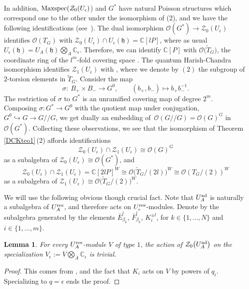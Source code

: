 \documentclass[10pt,a4paper]{amsart}
\numberwithin{equation}{section}
\newtheorem{lem}[teo]{Lemma}
\theoremstyle{definition}
\newcommand{\e}{\epsilon}
\newcommand{\mc}{\mathbb{C}}
\newcommand{\Oo}{{\mathcal O}}
\newcommand{\ra}{\rightarrow}
\begin{document}
In addition, ${\rm Maxspec}(\mathcal{Z}_0(U_\e)$) and $G^*$ have natural Poisson structures which correspond one to the other under the isomorphism of (2), and we have the following identifications (see~\cite[Section 21.2]{DC-K-P2}). The dual isomorphism $\mathcal{O}(G^*)\!\ra\! \mathcal{Z}_0(U_\e)$ identifies $\Oo(T_G)$ with ${\mathcal{Z}_0(U_\e)\! \cap \! U_\e(\mathfrak{h})\! =\! \mc[lP]}$, where as usual $U_\e(\mathfrak{h}) = U_A(\mathfrak{h}) \bigotimes_A \mc_\e$. Therefore, we can identify $\mc[P]$ with $\Oo\big(\tilde T_G\big)$, the coordinate ring of the $l^m$-fold covering space \smash{$\tilde T_G \ra T_G$}. The quantum Harish-Chandra isomorphism identifies $\mathcal{Z}_1(U_\e)$ with \smash{$\mc[2P]^W \cong \Oo\big(\tilde T_G/(2)\big)^W$}, where we denote by $(2)$ the subgroup of $2$-torsion elements in $\tilde T_G$. Consider the map
\[\sigma\colon\ B_+\times B_-\longrightarrow G^0,\qquad (b_+,b_-)\longmapsto b_+b_-^{-1}.\]
The restriction of $\sigma$ to $G^*$ is an unramified covering map of degree $2^m$.
Composing $\sigma\colon G^*\ra G^0$ with the quotient map under conjugation, $G^0 \hookrightarrow G \ra G/ /G$, we get dually an embedding of~${\Oo(G/ /G)=\mathcal{O}(G)^G}$ in $\mathcal{O}(G^*)$. Collecting these observations, we see that the isomorphism of Theorem \ref{DCKteo1}\,(2) affords identifications
\[\mathcal{Z}_0(U_\e)\cap \mathcal{Z}_1(U_\e) \cong \mathcal{O}(G)^G\]
as a subalgebra of $\mathcal{Z}_0(U_\e)\cong \Oo(G^*)$, and
\[\mathcal{Z}_0(U_\e)\cap \mathcal{Z}_1(U_\e) = \mc[2lP]^W \cong \Oo\bigl(\tilde T_G/(2l)\bigr)^W\cong \Oo(T_G/(2))^W\]
as a subalgebra of $\mathcal{Z}_1(U_\e)\cong \Oo\big(\tilde T_G/(2)\big)^W$.


We will use the following obvious though crucial fact. Note that $U_A^{\rm ad}$ is naturally a subalgebra of $U_A^{\rm res}$, and therefore acts on $U_\e^{\rm res}$-modules. Denote by  the subalgebra generated by the elements $\bar{E}_{\beta_k}^l$, $\bar {F}_{\beta_k}^l$, $K_i^{\pm l}$, for $k\in \{1,\dots, N\}$ and $i\in \{1,\dots,m\}$.
\begin{lem}\label{acttrivial} For every $U_A^{\rm res}$-module $V$ of type $1$, the action of $\mathcal{Z}_0\big(U_A^{\rm ad}\big)$ on the specialization $V_\e := V\bigotimes_A \mc_\e$ is trivial.
\end{lem}

\begin{proof} This comes from ,  and the fact that $K_i$ acts on $V$ by powers of $q_i$. Specializing to $q=\e$ ends the proof. \end{proof}
\end{document}
